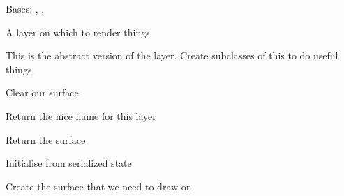 \documentclass[letterpaper,10pt,english]{sphinxmanual}
\begin{document}
\begin{fulllineitems}
\label{renderering:serge.render.RenderingLayer}
Bases: {\hyperref[common:serge.common.Loggable]{}}, {\hyperref[common:serge.serialize.Serializable]{}}, {\hyperref[common:serge.common.EventAware]{}}

A layer on which to render things

This is the abstract version of the layer. Create
subclasses of this to do useful things.

\begin{fulllineitems}
\label{renderering:serge.render.RenderingLayer.clearSurface}
Clear our surface

\end{fulllineitems}


\begin{fulllineitems}
\label{renderering:serge.render.RenderingLayer.getNiceName}
Return the nice name for this layer

\end{fulllineitems}


\begin{fulllineitems}
\label{renderering:serge.render.RenderingLayer.getSurface}
Return the surface

\end{fulllineitems}


\begin{fulllineitems}
\label{renderering:serge.render.RenderingLayer.init}
Initialise from serialized state

\end{fulllineitems}


\begin{fulllineitems}
\label{renderering:serge.render.RenderingLayer.initSurface}
Create the surface that we need to draw on


\end{fulllineitems}
\end{fulllineitems}
\end{document}
